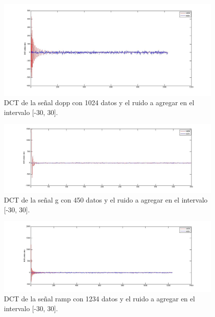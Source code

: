 \documentclass[10pt, a4paper]{article}
\begin{document}
\begin{itemize}
\begin{figure}[H] %
\begin{center}
\includegraphics[width=500pt]{./dopp1024_serui.jpg}
\caption[h]{DCT de la señal dopp con 1024 datos y el ruido a agregar en el intervalo [-30, 30].}
\end{center}
\end{figure}

\begin{figure}[H] %
\begin{center}
\includegraphics[width=500pt]{./g450_serui.jpg}
\caption[h]{DCT de la señal g con 450 datos y el ruido a agregar en el intervalo [-30, 30].}
\end{center}
\end{figure}

\begin{figure}[H] %
\begin{center}
\includegraphics[width=500pt]{./ramp1234_serui.jpg}
\caption[h]{DCT de la señal ramp con 1234 datos y el ruido a agregar en el intervalo [-30, 30].}
\end{center}
\end{figure}


\end{itemize}
\end{document}
